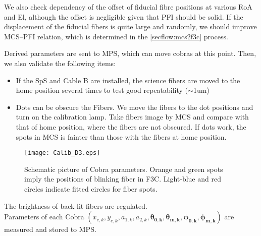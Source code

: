 We also check dependency of the offset of fiducial fibre positions at various RoA and El, although the offset is negligible given that PFI should be solid.
If the displacement of the fiducial fibers is quite large and randomly, we should improve MCS--PFI relation, which is determined in the \ref{secflow:mcs2f3c} process.

Derived parameters are sent to MPS, which can move cobras at this point.
Then, we also validate the following items:
\begin{itemize}
\item If the SpS and Cable B are installed, the science fibers are moved to the home position several times to test good repeatability ($\sim$1um)
\item Dots can be obscure the Fibers.
We move the fibers to the dot positions and turn on the calibration lamp.
Take fibers image by MCS and compare with that of home position, where the fibers are not obscured.
If dots work, the spots in MCS is fainter than those with the fibers at home position.
\end{itemize}



\begin{figure}[!ht]
\begin{center}
\texttt{[image: Calib\_D3.eps]}
\end{center}
\caption{Schematic picture of Cobra parameters.
Orange and green spots imply the positions of blinking fiber in F3C.
Light-blue and red circles indicate fitted circles for fiber spots.
}
\label{fig:Cobraparams}
\end{figure}


\begin{itembox}[l]{}
The brightness of back-lit fibers are regulated. \\
Parameters of each Cobra $(x_{c,k}, y_{c,k}, a_{1,k}, a_{2,k}, \bm{\theta _{0,k}}, \bm{\theta _{m,k}}, \bm{\phi _{0,k}}, \bm{\phi _{m,k}})$ are measured and stored to MPS.

\end{itembox}